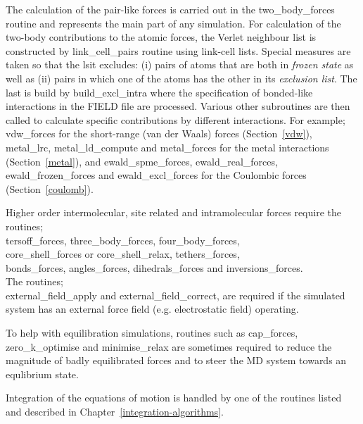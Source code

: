 The calculation of the pair-like forces is carried out in the
{\sc two\_body\_forces} routine and represents the main part of any
simulation.  For calculation of the two-body contributions to the
atomic forces, the Verlet neighbour list
is constructed by {\sc link\_cell\_pairs} routine using link-cell
lists.  Special measures are taken so that the lsit excludes: (i)
pairs of atoms that are both in {\em frozen state} as well as (ii)
pairs in which one of the atoms has the other in its
{\em exclusion list}.  The last is build by {\sc build\_excl\_intra}
where the specification of bonded-like interactions in the FIELD file
are processed.  Various other subroutines are then called to
calculate specific contributions by different interactions.  For example;
{\sc vdw\_forces} for the short-range (van der Waals)
forces (Section~\ref{vdw}), {\sc metal\_lrc}, {\sc metal\_ld\_compute} and
{\sc metal\_forces} for the metal interactions 
(Section~\ref{metal}), and {\sc ewald\_spme\_forces}, {\sc ewald\_real\_forces},
{\sc ewald\_frozen\_forces} and {\sc ewald\_excl\_forces} for the
Coulombic forces (Section~\ref{coulomb}).

Higher order intermolecular, site
related and intramolecular forces
require the routines; \\
{\sc tersoff\_forces}, {\sc three\_body\_forces},
{\sc four\_body\_forces}, \\
{\sc core\_shell\_forces} or {\sc core\_shell\_relax},
{\sc tethers\_forces}, \\
{\sc bonds\_forces}, {\sc angles\_forces}, {\sc dihedrals\_forces}
and {\sc inversions\_forces}.  \\
The routines; \\
{\sc external\_field\_apply} and {\sc external\_field\_correct},
are required if the simulated system has an external force field
(e.g. electrostatic field) operating.

To help with equilibration simulations, routines such as
{\sc cap\_forces}, {\sc zero\_k\_optimise} and {\sc minimise\_relax}
are sometimes required to reduce the magnitude of badly
equilibrated forces and to steer the MD system towards an
equlibrium state.

Integration of the equations of motion is handled by one of the
routines listed and described in Chapter~\ref{integration-algorithms}.

